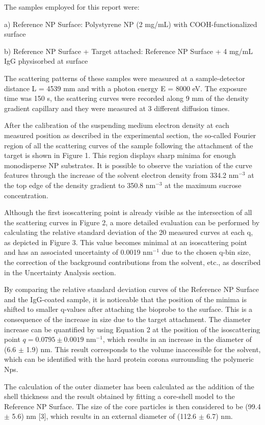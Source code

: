 The samples employed for this report were:

a) Reference NP Surface: Polystyrene NP (2 mg/mL) with COOH-functionalized surface

b) Reference NP Surface + Target attached: Reference NP Surface + 4 mg/mL IgG physisorbed at surface

The scattering patterns of these samples were measured at a sample-detector distance L = 4539 mm and with a photon energy E = 8000 eV. The exposure time was 150 s, the scattering curves were recorded along 9 mm of the density gradient capillary and they were measured at 3 different diffusion times.

After the calibration of the suspending medium electron density at each measured position as described in the experimental section, the so-called Fourier region of all the scattering curves of the sample following the attachment of the target is shown in Figure 1. This region displays sharp minima for enough monodisperse NP substrates. It is possible to observe the variation of the curve features through the increase of the solvent electron density from 334.2 nm$^{-3}$ at the top edge of the density gradient to 350.8 nm$^{-3}$ at the maximum sucrose concentration.

Although the first isoscattering point is already visible as the intersection of all the scattering curves in Figure 2, a more detailed evaluation can be performed by calculating the relative standard deviation of the 20 measured curves at each q, as depicted in Figure 3. This value becomes minimal at an isoscattering point and has an associated uncertainty of 0.0019 nm$^{-1}$ due to the chosen q-bin size, the correction of the background contributions from the solvent, etc., as described in the Uncertainty Analysis section.

By comparing the relative standard deviation curves of the Reference NP Surface and the IgG-coated sample, it is noticeable that the position of the minima is shifted to smaller q-values after attaching the bioprobe to the surface. This is a consequence of the increase in size due to the target attachment. The diameter increase can be quantified by using Equation 2 at the position of the isoscattering point $q=0.0795\pm0.0019$ nm$^{-1}$, which results in an increase in the diameter of (6.6 $\pm$ 1.9) nm. This result corresponds to the volume inaccessible for the solvent, which can be identified with the hard protein corona surrounding the polymeric Nps.

The calculation of the outer diameter has been calculated as the addition of the shell thickness and the result obtained by fitting a core-shell model to the Reference NP Surface. The size of the core particles is then considered to be  (99.4 $\pm$ 5.6) nm [3], which results in an external diameter of (112.6 $\pm$ 6.7) nm.


